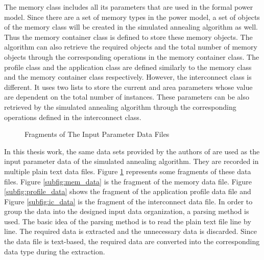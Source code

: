 	The memory class includes all its parameters that are used in the
	formal power model.  Since there are a set of memory types in the
	power model, a set of objects of the memory class will be created in
	the simulated annealing algorithm as well. Thus the memory container
	class is defined to store these memory objects.
	The algorithm can also retrieve the required objects and the
	total number of memory objects through the corresponding operations
	in the memory container class.
	The profile class and the application class are defined similarly
	to the memory class and the memory container class respectively.
	However, the interconnect class is different. It uses two lists to store the
	current and area parameters whose value are dependent on the total
	number of instances. These parameters can be also retrieved by the
	simulated annealing algorithm through the corresponding operations
	defined in the interconnect class.
	\begin{figure}[h]
		\begin{center}
			\qquad
			\qquad
		\end{center}
		\caption{Fragments of The Input Parameter Data Files \cite{Strobel2016}}
		\label{fig;input_data}
	\end{figure}

	In this thesis work, the same data sets provided by the authors of \cite{Strobel2016}
	are used as the input parameter data of the simulated
	annealing algorithm. They are recorded in multiple
	plain text data files. Figure \ref{fig;input_data} represents some fragments
	of these data files. Figure \ref{subfig:mem_data} is the fragment of the
	memory data file. Figure \ref{subfig:profile_data} shows the fragment of the
	application profile data file and Figure \ref{subfig:ic_data} is the
	fragment of the interconnect data file. In order to group the data
	into the designed input data organization, a
	parsing method is used. The basic idea of the parsing method is to read the
	plain text file line by line. The required data is extracted and the
	unnecessary data is discarded. Since the data file is text-based,
	the required data are converted into the corresponding data type during the
	extraction.

